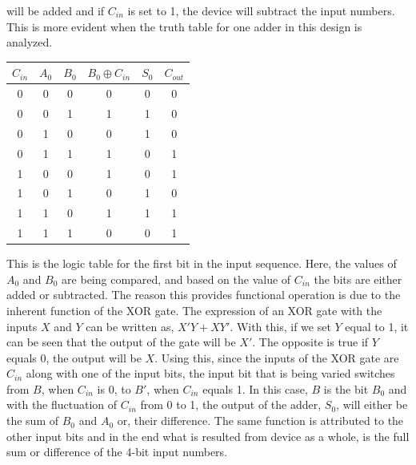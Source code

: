 \documentclass[12pt]{article}
\begin{document}
    will be added and if $C_{in}$ is set to 1, the device will subtract the
    input numbers. This is more evident when the truth table for one adder in
    this design is analyzed.
    \begin{table}[h]
        \centering
        \begin{tabular}{cccc|cc}
            \toprule
            $C_{in}$ & $A_0$ & $B_0$ & $B_0 \oplus C_{in}$ & $S_0$ & $C_{out}$ \\
            \midrule
            0 & 0 & 0 & 0 & 0 & 0 \\
            0 & 0 & 1 & 1 & 1 & 0 \\
            0 & 1 & 0 & 0 & 1 & 0 \\
            0 & 1 & 1 & 1 & 0 & 1 \\
            1 & 0 & 0 & 1 & 0 & 1 \\
            1 & 0 & 1 & 0 & 1 & 0 \\
            1 & 1 & 0 & 1 & 1 & 1 \\
            1 & 1 & 1 & 0 & 0 & 1 \\
            \bottomrule
        \end{tabular}
    \end{table}
    \par This is the logic table for the first bit in the input sequence. Here,
    the values of $A_0$ and $B_0$ are being compared, and based on the value of
    $C_{in}$ the bits are either added or subtracted. The reason this provides
    functional operation is due to the inherent function of the XOR gate. The
    expression of an XOR gate with the inputs $X$ and $Y$ can be written as,
    $X'Y+XY'$. With this, if we set $Y$ equal to 1, it can be seen that the
    output of the gate will be $X'$. The opposite is true if $Y$ equals 0, the
    output will be $X$.  Using this, since the inputs of the XOR gate are
    $C_{in}$ along with one of the input bits, the input bit that is being
    varied switches from $B$, when $C_{in}$ is 0, to $B'$, when $C_{in}$ equals
    1. In this case, $B$ is the bit $B_0$ and with the fluctuation of $C_{in}$
    from 0 to 1, the output of the adder, $S_0$, will either be the sum of $B_0$
    and $A_0$ or, their difference.  The same function is attributed to the
    other input bits and in the end what is resulted from device as a whole, is
    the full sum or difference of the 4-bit input numbers.
\end{document}
